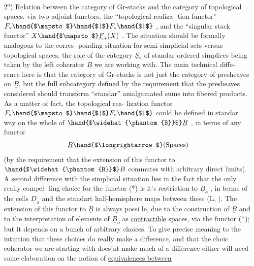 2\textsuperscript{o}) Relation between the category of Gr-stacks and the category of
topological spaces, via two adjoint functors, the ``topological realiza-%
tion functor'' $F_{\ast} \hand{$\mapsto$} \hand{$|$}F_{\ast}\hand{$|$}$ , and the ``singular stack functor''
$X \hand{$\mapsto$} \underline{F}_{\ast}(X)$ . The situation should be formally analogous to the corres-%
ponding situation for semi-simplicial sets versus topological spaces,
the role of the category $\underline{S}_{\ast}$ of standar ordered simplices being taken
by the left coherator $\underline{B}$ we are working with. The main technical diffe-%
rence here is that the category of Gr-stacks is not just the category of
presheaves on $\underline{B}$, but the full subcategory defined by the requirement
that the presheaves considered should transform ``standar'' amalgamated
sums into fibered products. As a matter of fact, the topological rea-%
lization functor $F_{\ast} \hand{$\mapsto$} \hand{$|$}F_{\ast}\hand{$|$}$ could be defined in standar way on the
whole of $\hand{$\widehat{\phantom{B}}$}\underline{B}$ , in terms of any functor 
\hand{(*)} \[ \underline{B} \hand{$\longrightarrow$} \text{(Spaces)} \]
(by the requirement that the extension of this functor to $\hand{$\widehat{\phantom{B}}$}B$ commutes
with arbitrary direct limits). A second difference with the  simplicial
 situation  lies in the fact that the only really compel-%
ling choice for the functor (*) is it's restriction to $\underline{B}_o$ , in terms
of the cells $\underline{D}_n$ and the standart half-hemisphere  maps between
these (L, ). The extension of this functor to $\underline{B}$ is always possi%
le, due to the  construction of $\underline{B}$ and to the interpretation of elements
 of $\underline{B}_o$ as \uline{contractible} spaces, via the functor (*); but it depends on
a bunch of arbitrary choices. To give precise meaning to the intuition
that these choices do really make a difference, and that the choic
 coherator we are starting with does'nt make much of a difference either\hand{,}
will need some elaboration on the notion of \uline{equivalences between}
